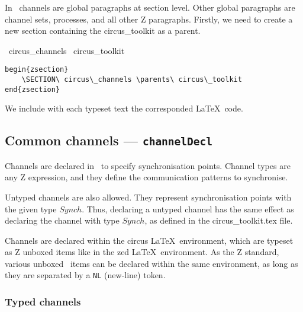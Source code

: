 \documentclass{article}
\newcommand{\grammar}[1]{\texttt{#1}}
\begin{document}
In \Circus\ channels are global paragraphs at section level. Other global
paragraphs are channel sets, processes, and all other Z paragraphs. Firstly, we
need to create a new section containing the \textsf{circus\_toolkit} as a
parent.

\begin{zsection}
  \SECTION\ circus\_channels \parents\ circus\_toolkit
\end{zsection}%
%
%
%
\begin{verbatim}
begin{zsection}
    \SECTION\ circus\_channels \parents\ circus\_toolkit
end{zsection}
\end{verbatim}
%
We include with each typeset text the corresponded \LaTeX\ code.


\subsection{Common channels --- \grammar{channelDecl}}

Channels are declared in \Circus\ to specify synchronisation points. Channel
types are any Z expression, and they define the communication patterns to
synchronise.

Untyped channels are also allowed. They represent synchronisation points with
the given type $Synch$. Thus, declaring a untyped channel has the same effect
as declaring the channel with type $Synch$, as defined in the
\textsf{circus\_toolkit.tex} file.

Channels are declared within the \textsf{circus} \LaTeX\ environment, which are
typeset as Z unboxed items like in the \textsf{zed} \LaTeX\ environment. As the
Z standard, various unboxed \Circus\ items can be declared within the same
environment, as long as they are separated by a \grammar{NL} (new-line) token.

\subsubsection{Typed channels}
\end{document}
